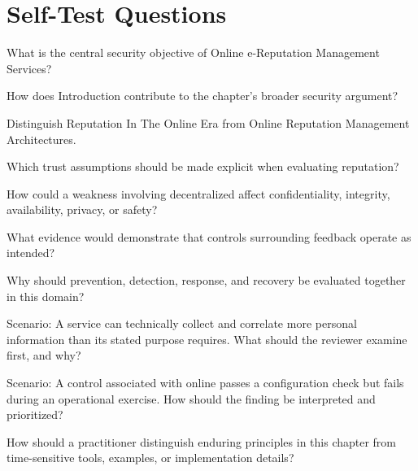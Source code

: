 \documentclass[11pt,letterpaper]{article}
\begin{document}
\section*{Self-Test Questions}
\begin{CornellRecallList}
\item What is the central security objective of Online e-Reputation Management Services?
\item How does Introduction contribute to the chapter's broader security argument?
\item Distinguish Reputation In The Online Era from Online Reputation Management Architectures.
\item Which trust assumptions should be made explicit when evaluating reputation?
\item How could a weakness involving decentralized affect confidentiality, integrity, availability, privacy, or safety?
\item What evidence would demonstrate that controls surrounding feedback operate as intended?
\item Why should prevention, detection, response, and recovery be evaluated together in this domain?
\item Scenario: A service can technically collect and correlate more personal information than its stated purpose requires. What should the reviewer examine first, and why?
\item Scenario: A control associated with online passes a configuration check but fails during an operational exercise. How should the finding be interpreted and prioritized?
\item How should a practitioner distinguish enduring principles in this chapter from time-sensitive tools, examples, or implementation details?
\end{CornellRecallList}
\end{document}
